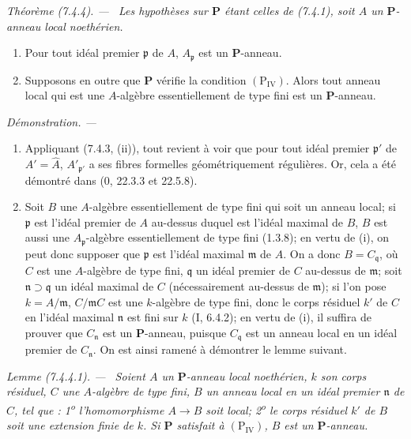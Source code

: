 \documentclass[10pt,oneside]{book}
\newcommand{\oldpage}[2][]{%
  \setcounter{footnote}{0}%
  \marginpar{\scriptsize\textbf{#1}~|~#2}\ignorespaces}
\newenvironment{theorem}[1][]{%
  \par\medskip\noindent\itshape Théorème (#1). ---\ }{\par}
\newenvironment{lemma}[1][]{%
  \par\medskip\noindent\itshape Lemme (#1). ---\ }{\par}
\newenvironment{proof}{%
  \par\medskip\noindent\textit{Démonstration. ---\ }}{\par}
\begin{document}
\begin{theorem}[7.4.4]
\label{IV.2.s7.4.4-fr}
Les hypothèses sur $\boldsymbol P$ étant celles de (7.4.1), soit $A$ un
$\boldsymbol P$-anneau local noethérien.
\begin{enumerate}
\item[\emph{(i)}] Pour tout idéal premier $\mathfrak p$ de $A$,
$A_{\mathfrak p}$ est un $\boldsymbol P$-anneau.
\item[\emph{(ii)}] Supposons en outre que $\boldsymbol P$ vérifie la condition
$(\mathrm P_{\mathrm{IV}})$. Alors tout anneau local qui est une
$A$-algèbre essentiellement de type fini est un $\boldsymbol P$-anneau.
\end{enumerate}
\end{theorem}

\begin{proof}
\begin{enumerate}
\item[\emph{(i)}] Appliquant (7.4.3, (ii)), tout revient à voir que pour tout
idéal premier $\mathfrak p'$ de $A'=\widehat A$,
$A'_{\mathfrak p'}$ a ses fibres formelles géométriquement régulières. Or,
cela a été démontré dans (0, 22.3.3 et 22.5.8).

\oldpage[IV-2]{200}

\item[\emph{(ii)}] Soit $B$ une $A$-algèbre essentiellement de type fini qui
soit un anneau local; si $\mathfrak p$ est l'idéal premier de $A$ au-dessus
duquel est l'idéal maximal de $B$, $B$ est aussi une
$A_{\mathfrak p}$-algèbre essentiellement de type fini (1.3.8); en vertu de
(i), on peut donc supposer que $\mathfrak p$ est l'idéal maximal $\mathfrak m$
de $A$. On a donc $B=C_{\mathfrak q}$, où $C$ est une $A$-algèbre de type
fini, $\mathfrak q$ un idéal premier de $C$ au-dessus de $\mathfrak m$; soit
$\mathfrak n\supset\mathfrak q$ un idéal maximal de $C$ (nécessairement
au-dessus de $\mathfrak m$); si l'on pose $k=A/\mathfrak m$,
$C/\mathfrak mC$ est une $k$-algèbre de type fini, donc le corps résiduel
$k'$ de $C$ en l'idéal maximal $\mathfrak n$ est fini sur $k$ (I, 6.4.2);
en vertu de (i), il suffira de prouver que $C_{\mathfrak n}$ est un
$\boldsymbol P$-anneau, puisque $C_{\mathfrak q}$ est un anneau local en un
idéal premier de $C_{\mathfrak n}$. On est ainsi ramené à démontrer le
lemme suivant.
\end{enumerate}
\end{proof}

\begin{lemma}[7.4.4.1]
\label{IV.2.s7.4.4.1-fr}
Soient $A$ un $\boldsymbol P$-anneau local noethérien, $k$ son corps
résiduel, $C$ une $A$-algèbre de type fini, $B$ un anneau local en un idéal
premier $\mathfrak n$ de $C$, tel que : 1\textsuperscript{o}
l'homomorphisme $A\to B$ soit local; 2\textsuperscript{o} le corps résiduel
$k'$ de $B$ soit une extension finie de $k$. Si $\boldsymbol P$ satisfait à
$(\mathrm P_{\mathrm{IV}})$, $B$ est un $\boldsymbol P$-anneau.
\end{lemma}
\end{document}
